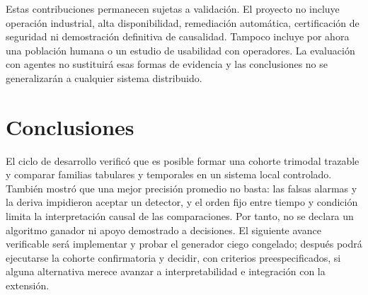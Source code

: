 \documentclass[conference]{IEEEtran}
\begin{document}
Estas contribuciones permanecen sujetas a validación. El proyecto no incluye operación industrial, alta disponibilidad, remediación automática, certificación de seguridad ni demostración definitiva de causalidad. Tampoco incluye por ahora una población humana o un estudio de usabilidad con operadores. La evaluación con agentes no sustituirá esas formas de evidencia y las conclusiones no se generalizarán a cualquier sistema distribuido.

\section{Conclusiones}

El ciclo de desarrollo verificó que es posible formar una cohorte trimodal trazable y comparar familias tabulares y temporales en un sistema local controlado. También mostró que una mejor precisión promedio no basta: las falsas alarmas y la deriva impidieron aceptar un detector, y el orden fijo entre tiempo y condición limita la interpretación causal de las comparaciones. Por tanto, no se declara un algoritmo ganador ni apoyo demostrado a decisiones. El siguiente avance verificable será implementar y probar el generador ciego congelado; después podrá ejecutarse la cohorte confirmatoria y decidir, con criterios preespecificados, si alguna alternativa merece avanzar a interpretabilidad e integración con la extensión.
\end{document}
